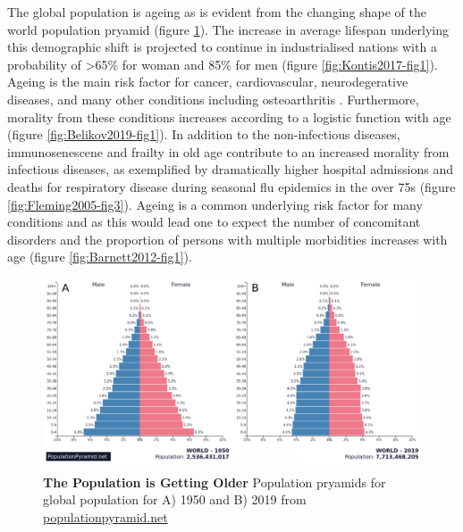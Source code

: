 \documentclass[
]{book}
\begin{document}
The global population is ageing as is evident from the changing shape of the world population pryamid (figure \ref{fig:poppyramid}). The increase in average lifespan underlying this demographic shift is projected to continue in industrialised nations with a probability of \textgreater65\% for woman and 85\% for men \citep{Kontis2017} (figure \ref{fig:Kontis2017-fig1}). Ageing is the main risk factor for cancer, cardiovascular, neurodegerative diseases, and many other conditions including osteoarthritis \citep{Niccoli2012}. Furthermore, morality from these conditions increases according to a logistic function with age \citep{Belikov2019} (figure \ref{fig:Belikov2019-fig1}). In addition to the non-infectious diseases, immunosenescene and frailty in old age contribute to an increased morality from infectious diseases, as exemplified by dramatically higher hospital admissions and deaths for respiratory disease during seasonal flu epidemics in the over 75s \citep{Fleming2005} (figure \ref{fig:Fleming2005-fig3}). Ageing is a common underlying risk factor for many conditions and as this would lead one to expect the number of concomitant disorders and the proportion of persons with multiple morbidities increases with age \citep{Barnett2012} (figure \ref{fig:Barnett2012-fig1}).

\begin{figure}

{\centering \includegraphics[width=0.95\linewidth]{figs/population-pryamids-1950-2019} 

}

\caption{\textbf{The Population is Getting Older} Population pryamids for global population for A) 1950 and B) 2019 from \url{populationpyramid.net}}\label{fig:poppyramid}
\end{figure}
\end{document}
